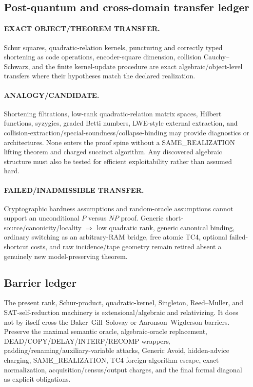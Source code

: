 \documentclass[11pt]{article}
\begin{document}
\subsection{Post-quantum and cross-domain transfer ledger}

\paragraph{EXACT OBJECT/THEOREM TRANSFER.}
Schur squares, quadratic-relation kernels, puncturing and correctly typed
shortening as code operations, encoder-square dimension, collision
Cauchy--Schwarz, and the finite kernel-update procedure are exact
algebraic/object-level transfers where their hypotheses match the declared
realization.

\paragraph{ANALOGY/CANDIDATE.}
Shortening filtrations, low-rank quadratic-relation matrix spaces, Hilbert
functions, syzygies, graded Betti numbers, LWE-style external extraction,
and collision-extraction/special-soundness/collapse-binding may provide
diagnostics or architectures.  None enters the proof spine without a
SAME\_REALIZATION lifting theorem and charged succinct algorithm.  Any
discovered algebraic structure must also be tested for efficient
exploitability rather than assumed hard.

\paragraph{FAILED/INADMISSIBLE TRANSFER.}
Cryptographic hardness assumptions and random-oracle assumptions cannot
support an unconditional \(P\) versus \(NP\) proof.  Generic
short-source/canonicity/locality \(\Rightarrow\) low quadratic rank,
generic canonical binding, ordinary switching as an arbitrary-RAM bridge,
free atomic TC4, optional failed-shortcut costs, and raw incidence/tape
geometry remain retired absent a genuinely new model-preserving theorem.

\subsection{Barrier ledger}

The present rank, Schur-product, quadratic-kernel, Singleton, Reed--Muller,
and SAT-self-reduction machinery is extensional/algebraic and relativizing.
It does not by itself cross the Baker--Gill--Solovay or
Aaronson--Wigderson barriers.  Preserve the maximal semantic oracle,
algebraic-oracle replacement, DEAD/COPY/DELAY/INTERP/RECOMP wrappers,
padding/renaming/auxiliary-variable attacks, Generic Avoid, hidden-advice
charging, SAME\_REALIZATION, TC4 foreign-algorithm escape, exact
normalization, acquisition/census/output charges, and the final formal
diagonal as explicit obligations.
\end{document}
